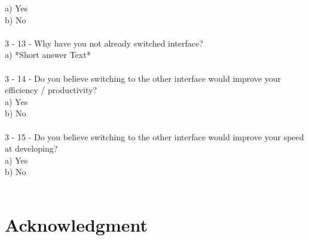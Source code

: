 \documentclass[]{report}
\begin{document}
	a) Yes\\
	b) No\\\\
	3 - 13 - Why have you not already switched interface?\\
	a) *Short answer Text*\\\\
	3 - 14 - Do you believe switching to the other interface would improve your efficiency / productivity?\\
	a) Yes\\
	b) No\\\\
	3 - 15 - Do you believe switching to the other interface would improve your speed at developing?\\
	a) Yes\\
	b) No\\\\
	\section{Acknowledgment}


\printbibliography[title=References]
\end{document}
